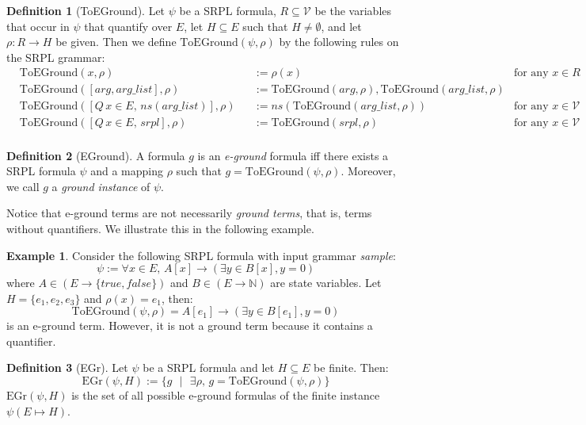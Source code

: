 \documentclass[12pt]{article}
\theoremstyle{definition}
\newtheorem{definition}{Definition}
\newtheorem{example}{Example}
\theoremstyle{remark}
\newcommand{\st}{\text{ }|\text{ }}
\newcommand{\gr}{\text{EGr}}
\newcommand{\toground}{\text{ToEGround}}
\begin{document}
\begin{definition}[ToEGround]
  Let $\psi$ be a SRPL formula, $R \subseteq \mathcal{V}$ be the variables that occur in $\psi$ that quantify over $E$, let $H \subseteq E$ such that $H \neq \emptyset$, and let $\rho : R \to H$ be given.  Then we define $\toground(\psi,\rho)$ by the following rules on the SRPL grammar:
  \begin{align*}
    &\toground(x,\rho)& &:= \rho(x) \qquad &\text{for any } x \in R\\
    &\toground([arg,arg\_list],\rho)& &:= \toground(arg,\rho),\toground(arg\_list,\rho)\\
    &\toground([Q \, x \in E, \, ns(arg\_list)],\rho)& &:= ns(\toground(arg\_list,\rho)) \qquad &\text{for any } x \in \mathcal{V}\\
    &\toground([Q \, x \in E, \, srpl],\rho)& &:= \toground(srpl,\rho)  \qquad &\text{for any } x \in \mathcal{V}\\
  \end{align*}
\end{definition}

\begin{definition}[EGround]
  A formula $g$ is an \textit{e-ground} formula iff there exists a SRPL formula $\psi$ and a mapping $\rho$ such that $g = \toground(\psi,\rho)$.  Moreover, we call $g$ a \textit{ground instance} of $\psi$.
\end{definition}

Notice that e-ground terms are not necessarily \textit{ground terms}, that is, terms without quantifiers.  We illustrate this in the following example.

\begin{example}
  Consider the following SRPL formula with input grammar \textit{sample}:
  $$\psi := \forall x \in E, \, A[x] \rightarrow (\exists y \in B[x], y = 0)$$
  where $A \in (E \to \{true,false\})$ and $B \in (E \to \mathbb{N})$ are state variables.  Let $H = \{e_1,e_2,e_3\}$ and $\rho(x) = e_1$, then:
  $$\toground(\psi,\rho) = A[e_1] \rightarrow (\exists y \in B[e_1], y = 0)$$
  is an e-ground term.  However, it is not a ground term because it contains a quantifier.
\end{example}

\begin{definition}[EGr]
  Let $\psi$ be a SRPL formula and let $H \subseteq E$ be finite.  Then:
  $$\gr(\psi,H) := \{g \st \exists \rho, \, g = \toground(\psi,\rho)\}$$
  $\gr(\psi,H)$ is the set of all possible e-ground formulas of the finite instance $\psi(E \mapsto H)$.
\end{definition}
\end{document}
